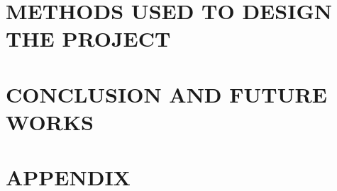 \documentclass[a4paper,12pt]{extreport}
\begin{document}


\centering
\chapter{\hfil METHODS USED TO DESIGN THE PROJECT \hfil}
\justifying








\newpage
\centering
\chapter{\hfil CONCLUSION AND FUTURE WORKS \hfil}
\justifying

\newpage
\centering
\chapter*{\hfil APPENDIX \hfil}
\justifying

\nocite{*} %

\end{document}
